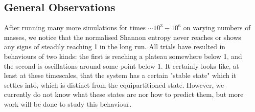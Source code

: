 \documentclass{article}
\begin{document}
\subsection{General Observations}
After running many more simulations for times $\sim10^3-10^6$ on varying numbers of masses,
we notice that the normalised Shannon entropy never reaches or shows any signs of 
steadily reaching 1 in the long run. All trials have resulted in behaviours of two kinds: 
the first is reaching a plateau somewhere below 1, and the second is oscillations around some point below 1. 
It certainly looks like, at least at these timescales, 
 that the system has a certain "stable state" which it settles into, which is 
distinct from the equipartitioned state. However, we currently do not know what these states are nor how to predict them, 
but more work will be done to study this behaviour. 
\end{document}
